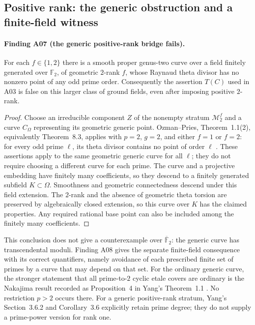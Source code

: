 
\subsection{Positive rank: the generic obstruction and a finite-field witness}
\label{sec:positive-rank-followup}

\paragraph{Finding A07 (the generic positive-rank bridge fails).}
For each $f\in\{1,2\}$ there is a smooth proper genus-two curve over a
field finitely generated over $\mathbb F_2$, of geometric $2$-rank $f$,
whose Raynaud theta divisor has no nonzero point of any odd prime order.
Consequently the assertion $T(C)$ used in A03 is false on this larger
class of ground fields, even after imposing positive $2$-rank.

\begin{proof}
Choose an irreducible component $Z$ of the nonempty stratum
$\mathcal M_2^f$ and a curve $C_\Omega$ representing its geometric
generic point. Ozman--Pries, Theorem~1.1(2), equivalently
Theorem~8.3, applies with $p=2$, $g=2$, and either $f=1$ or $f=2$:
for every odd prime $\ell$, its theta divisor contains no point of
order $\ell$ \cite[pp.~456,473]{OzmanPries2019}.
These assertions apply to the same geometric generic curve for all
$\ell$; they do not require choosing a different curve for each prime.
The curve and a projective embedding have finitely many coefficients,
so they descend to a finitely generated subfield $K\subset\Omega$.
Smoothness and geometric connectedness descend under this field
extension. The $2$-rank and the absence of geometric theta torsion
are preserved by algebraically closed extension, so this curve over
$K$ has the claimed properties. Any required rational base point can
also be included among the finitely many coefficients.
\end{proof}

This conclusion does not give a counterexample over
$\overline{\mathbb F}_2$: the generic curve has transcendental moduli.
Finding A08 gives the separate finite-field consequence with its
correct quantifiers, namely avoidance of each prescribed finite set
of primes by a curve that may depend on that set.
For the ordinary generic curve, the stronger statement that all
prime-to-$2$ cyclic etale covers are ordinary is the Nakajima result
recorded as Proposition~4 in Yang's Theorem~1.1
\cite[Theorem~1.1]{Yang2021}. No restriction $p>2$ occurs there.
For a generic positive-rank stratum, Yang's Section~3.6.2 and
Corollary~3.6 explicitly retain prime degree; they do not supply a
prime-power version for rank one.

